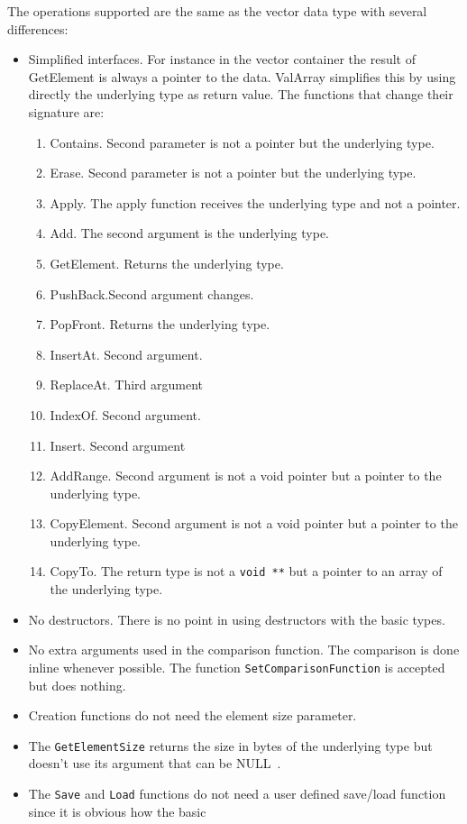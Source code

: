 \documentclass[12pt,a4paper,openany]{memoir} %
\newif\iftth
\newcommand{\Null}{{\iftth \ NULL \else \footnotesize NULL\  \fi}}
\begin{document}
{{The operations supported are the same as the vector data type with several differences:
\begin{itemize}
\item Simplified interfaces. For instance in the vector container the result of GetElement is always a pointer to the data. ValArray simplifies this by
using directly the underlying type as return value. The functions that change their signature are:
\begin{enumerate}
\item Contains. Second parameter is not a pointer but the underlying type.
\item Erase. Second parameter is not a pointer but the underlying type.
\item Apply. The apply function receives the underlying type and not a pointer.
\item Add. The second argument is the underlying type.
\item GetElement. Returns the underlying type.
\item PushBack.Second argument changes.
\item PopFront. Returns the underlying type.
\item InsertAt. Second argument.
\item ReplaceAt. Third argument
\item IndexOf. Second argument.
\item Insert. Second argument
\item AddRange. Second argument is not a void pointer but a pointer to the underlying type.
\item CopyElement. Second argument is not a void pointer but a pointer to the underlying type.
\item CopyTo. The return type is not a \texttt{void **} but a pointer to an array of the underlying type.
\end{enumerate}
\item No destructors. There is no point in using destructors with the basic types.
\item No extra arguments used in the comparison function. The comparison is done inline whenever possible. The function \texttt{SetComparisonFunction}
is accepted but does nothing.
\item Creation functions do not need the element size parameter.
\item The \texttt{GetElementSize} returns the size in bytes of the underlying type but doesn't use its argument that can be \Null.
\item The \texttt{Save} and \texttt{Load} functions do not need a user defined save/load function since it is obvious how the basic

\end{itemize}}}
\end{document}
